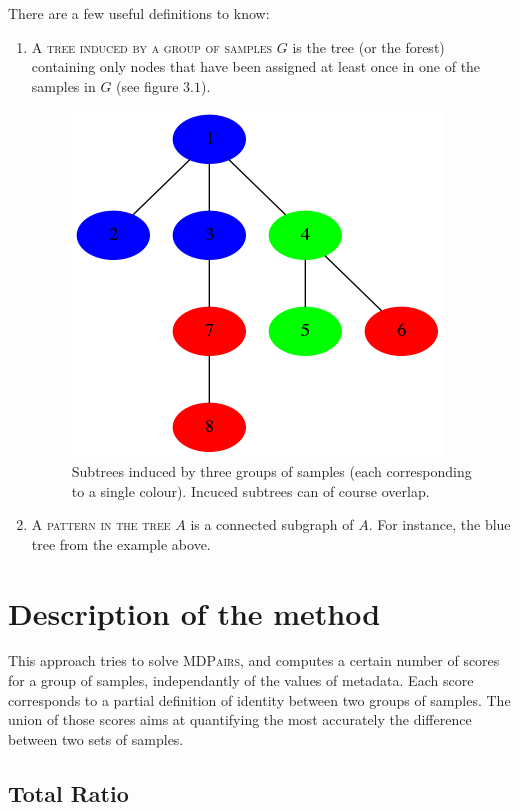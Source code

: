 \documentclass{report}
\begin{document}
There are a few useful definitions to know:
\begin{enumerate}
\item \textsc{A tree induced by a group of samples $G$} is the tree (or the forest) containing only nodes that have been assigned at least once in one of the samples in $G$ (see figure $3.1$).

\begin{figure}[H]
\centering
\includegraphics[scale=0.5]{illustrations/inducedtree.png}
\caption{Subtrees induced by three groups of samples (each corresponding to a single colour). Incuced subtrees can of course overlap.}
\end{figure}

\item \textsc{A pattern in the tree $A$} is a connected subgraph of $A$. For instance, the blue tree from the example above.
\end{enumerate}

\newpage

\section{Description of the method}

This approach tries to solve \textsc{MDPairs}, and computes a certain number of scores for a group of samples, independantly of the values of metadata. Each score corresponds to a partial definition of identity between two groups of samples. The union of those scores aims at quantifying the most accurately the difference between two sets of samples.

\subsection{Total Ratio}
\end{document}
